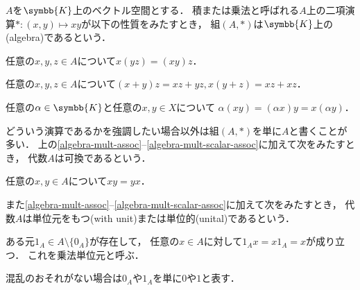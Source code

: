 \documentclass[../main.tex]{subfiles}
\begin{document}
\nocite{miyajima-functional-analysis}

\begin{thmbox}
\begin{definition}[（代数）]
\(A\)を\(\symbb{K}\)上のベクトル空間とする．
積または乗法と呼ばれる\(A\)上の二項演算\(\mathord{\ast}\colon (x, y) \mapsto x y\)が以下の性質をみたすとき，
組\((A, \mathord{\ast})\)は\(\symbb{K}\)上の(algebra)であるという．
\begin{conditions}
    \item\label{algebra-mult-assoc} 任意の\(x, y, z \in A\)について\(x (yz) = (xy) z\)．
    \item 任意の\(x, y, z \in A\)について\((x + y) z = xz + yz, x (y + z) = xz + xz\)．
    \item\label{algebra-mult-scalar-assoc} 任意の\(\alpha \in \symbb{K}\)と任意の\(x, y \in X\)について
        \(\alpha (xy) = (\alpha x) y = x (\alpha y)\)．
\end{conditions}
どういう演算であるかを強調したい場合以外は組\((A, \mathord{\ast})\)を単に\(A\)と書くことが多い．
上の\ref{algebra-mult-assoc}--\ref{algebra-mult-scalar-assoc}に加えて次をみたすとき，
代数\(A\)は可換であるという．
\begin{conditions}[resume]
    \item 任意の\(x, y\in A\)について\(x y  = y x\)．
\end{conditions}
また\ref{algebra-mult-assoc}--\ref{algebra-mult-scalar-assoc}に加えて次をみたすとき，
代数\(A\)は単位元をもつ(with unit)または単位的(unital)であるという．
\begin{conditions}[resume]
    \item ある元\(1_A \in A \setminus \{0_A\}\)が存在して，
        任意の\(x \in A\)に対して\(1_A x  = x 1_A = x\)が成り立つ．
        これを乗法単位元と呼ぶ．
\end{conditions}
\end{definition}
\end{thmbox}

\noindent 混乱のおそれがない場合は\(0_A\)や\(1_A\)を単に\(0\)や\(1\)と表す．
\end{document}
